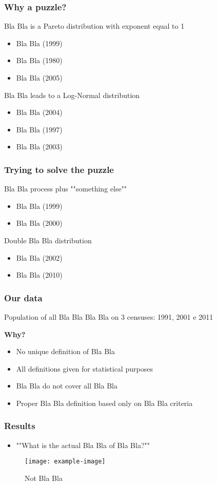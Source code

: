 \documentclass{beamer}
\begin{document}
\begin{frame}
\frametitle{Why a puzzle?}
Bla Bla is a Pareto distribution with exponent equal to 1\\
\begin{itemize}
\item Bla Bla (1999)
\item Bla Bla (1980)
\item Bla Bla (2005)
\end{itemize}
Bla Bla leads to a Log-Normal distribution\\
\begin{itemize}
\item Bla Bla (2004)
\item Bla Bla (1997)
\item Bla Bla (2003)
\end{itemize}
\end{frame}

\begin{frame}
\frametitle{Trying to solve the puzzle}
Bla Bla process plus ""something else""
\begin{itemize}
\item Bla Bla (1999)
\item Bla Bla (2000)
\end{itemize}
Double Bla Bla distribution
\begin{itemize}
\item Bla Bla (2002)
\item Bla Bla (2010)
\end{itemize}
\end{frame}

\begin{frame}
\frametitle{Our data}
Population of all Bla Bla Bla Bla on 3 censuses: 1991, 2001 e 2011\\
\begin{center}
\textbf{Why?}
\end{center}
\begin{itemize}
\item No unique definition of Bla Bla  \pause
\item All definitions given for statistical purposes \pause
\item Bla Bla do not cover all Bla Bla \pause
\item Proper Bla Bla definition based only on Bla Bla criteria
\end{itemize}
\end{frame}

\begin{frame}
\frametitle{Results}
\begin{itemize}
\item ""What is the actual Bla Bla of Bla Bla?""
\end{itemize}
\begin{figure}[h!]
\begin{center}
\texttt{[image: example-image]}
\end{center}
\begin{center}
Not Bla Bla
\end{center}
\end{figure}
\end{frame}
\end{document}
